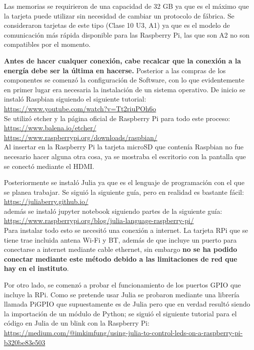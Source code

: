 \documentclass[twocolumn, letterpaper,aps,pra,10pt]{revtex4-1}
\begin{document}
Las memorias se requirieron de una capacidad de 32 GB ya que es el máximo que la tarjeta puede utilizar sin necesidad de cambiar un protocolo de fábrica. Se consideraron tarjetas de este tipo (Clase 10 U3, A1) ya que es el modelo de comunicación más rápida disponible para las Raspberry Pi, las que son A2 no son compatibles por el momento. 

\textbf{Antes de hacer cualquer conexión, cabe recalcar que la conexión a la energía debe ser la última en hacerse.}
Posterior a las compras de los componentes se comenzó la configuración de Software, con lo que evidentemente en primer lugar era necesaria la instalación de un sistema operativo. De inicio se instaló Raspbian siguiendo el siguiente tutorial: \\
\url{https://www.youtube.com/watch?v=Tt2riuPOh6o}
\\

Se utilizó etcher y la página oficial de Raspberry Pi para todo este proceso:
\\
\url{https://www.balena.io/etcher/}\\
\url{https://www.raspberrypi.org/downloads/raspbian/}
\\

Al insertar en la Raspberry Pi la tarjeta microSD que contenía Raspbian no fue necesario hacer alguna otra cosa, ya se mostraba el escritorio con la pantalla que se conectó mediante el HDMI. 

Posteriormente se instaló Julia ya que es el lenguaje de programación con el que se planea trabajar. Se siguió la siguiente guía, pero en realidad es bastante fácil:\\
\url{https://juliaberry.github.io/}
\\
además se instaló jupyter notebook siguiendo partes de la siguiente guía:\\
\url{https://www.raspberrypi.org/blog/julia-language-raspberry-pi/}
\\

Para instalar todo esto se necesitó una conexión a internet. La tarjeta RPi que se tiene trae incluida antena Wi-Fi y BT, además de que incluye un puerto para conectarse a internet mediante cable ethernet, sin embargo \textbf{no se ha podido conectar mediante este método debido a las limitaciones de red que hay en el instituto}.

Por otro lado, se comenzó a probar el funcionamiento de los puertos GPIO que incluye la RPi. Como se pretende usar Julia se probaron mediante una librería llamada PiGPIO que supuestamente es de Julia pero que en verdad resultó siendo la importación de un módulo de Python; se siguió el siguiente tutorial para el código en Julia de un blink con la Raspberry Pi:
\\
\url{https://medium.com/@imkimfung/using-julia-to-control-leds-on-a-raspberry-pi-b320be83e503}
\\
\end{document}
